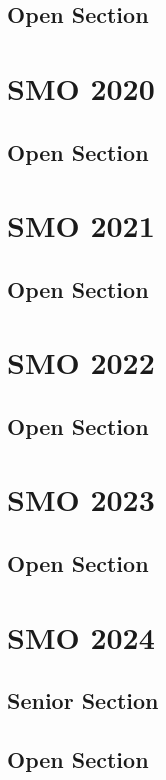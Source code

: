 \documentclass[a4paper,listof=totoc,bibliography=totoc,openany]{scrbook}
\begin{document}
\section{Open Section}




\chapter{SMO 2020}
\section{Open Section}


\chapter{SMO 2021}
\section{Open Section}


\chapter{SMO 2022}
\section{Open Section}



\chapter{SMO 2023}
\section{Open Section}



\chapter{SMO 2024}
\section{Senior Section}



\section{Open Section}


\end{document}
